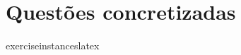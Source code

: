 \documentclass[a4paper]{book}
\begin{document}
\frontmatter

\tableofcontents


\mainmatter


\chapter{Questões concretizadas}


{{exerciseinstanceslatex}}
\end{document}
